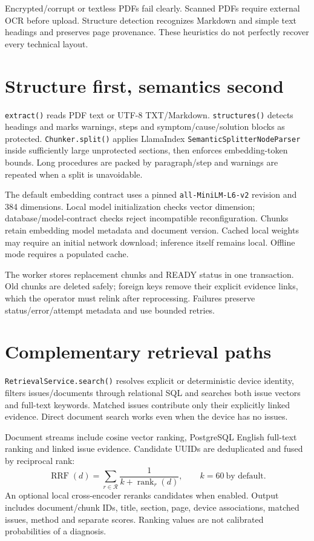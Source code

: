 Encrypted/corrupt or textless PDFs fail clearly. Scanned PDFs require external OCR before upload. Structure detection recognizes Markdown and simple text headings and preserves page provenance. These heuristics do not perfectly recover every technical layout.
\section*{Structure first, semantics second}
\texttt{extract()} reads PDF text or UTF-8 TXT/Markdown. \texttt{structures()} detects headings and marks warnings, steps and symptom/cause/solution blocks as protected. \texttt{Chunker.split()} applies LlamaIndex \texttt{SemanticSplitterNodeParser} inside sufficiently large unprotected sections, then enforces embedding-token bounds. Long procedures are packed by paragraph/step and warnings are repeated when a split is unavoidable.

The default embedding contract uses a pinned \texttt{all-MiniLM-L6-v2} revision and 384 dimensions. Local model initialization checks vector dimension; database/model-contract checks reject incompatible reconfiguration. Chunks retain embedding model metadata and document version. Cached local weights may require an initial network download; inference itself remains local. Offline mode requires a populated cache.

The worker stores replacement chunks and READY status in one transaction. Old chunks are deleted safely; foreign keys remove their explicit evidence links, which the operator must relink after reprocessing. Failures preserve status/error/attempt metadata and use bounded retries.
\section*{Complementary retrieval paths}
\texttt{RetrievalService.search()} resolves explicit or deterministic device identity, filters issues/documents through relational SQL and searches both issue vectors and full-text keywords. Matched issues contribute only their explicitly linked evidence. Direct document search works even when the device has no issues.

Document streams include cosine vector ranking, PostgreSQL English full-text ranking and linked issue evidence. Candidate UUIDs are deduplicated and fused by reciprocal rank:
\[
\operatorname{RRF}(d)=\sum_{r\in\mathcal R}\frac{1}{k+\operatorname{rank}_r(d)},\qquad k=60\ \text{by default}.
\]
An optional local cross-encoder reranks candidates when enabled. Output includes document/chunk IDs, title, section, page, device associations, matched issues, method and separate scores. Ranking values are not calibrated probabilities of a diagnosis.
